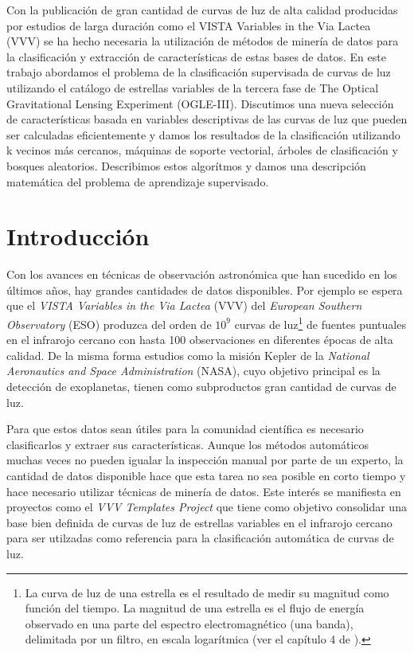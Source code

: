 \documentclass[letterpaper,12pt]{book}
\begin{document}
Con la publicación de gran cantidad de curvas de luz de alta calidad producidas por  estudios de larga duración como el  VISTA Variables in the Via Lactea (VVV) se ha hecho necesaria la utilización de métodos de minería de datos para la clasificación y extracción de características de estas bases de datos. En este trabajo abordamos el problema de la clasificación supervisada de curvas de luz utilizando el catálogo de  estrellas variables de la tercera fase de The Optical Gravitational Lensing Experiment (OGLE-III). Discutimos una nueva selección de características basada en variables descriptivas de las curvas de luz que pueden ser calculadas eficientemente y damos los resultados de la clasificación utilizando k vecinos más cercanos, máquinas de soporte vectorial, árboles de clasificación y bosques aleatorios. Describimos estos algorítmos y damos una descripción matemática del problema de aprendizaje supervisado.



\tableofcontents

 
\chapter{Introducción}

Con los avances en técnicas de observación astronómica que han sucedido en los últimos años, hay grandes cantidades de datos disponibles. Por ejemplo se espera que el \textit{VISTA Variables in the Via Lactea} (VVV) del \textit{European Southern Observatory} (ESO) produzca del orden de $10^{9}$ curvas de luz\footnote{\label{nota:curvasDeLuz} La curva de luz de una estrella es el resultado de medir su magnitud como función del tiempo. La magnitud de una estrella es el flujo de energía observado en una parte del espectro electromagnético (una banda), delimitada por un filtro, en escala logarítmica (ver el capítulo 4 de \cite{karttunen_fundamental_2007}).} de fuentes puntuales en el infrarojo cercano con hasta 100 observaciones en diferentes épocas de alta calidad. De la misma forma estudios como la misión Kepler de la \textit{National Aeronautics and Space Administration} (NASA), cuyo objetivo principal es la detección de exoplanetas,  tienen como subproductos gran cantidad de curvas  de luz. 

Para que estos datos sean útiles para la comunidad científica es necesario clasificarlos y extraer sus características. Aunque los métodos automáticos muchas veces no pueden igualar la inspección manual por parte de un experto, la cantidad de datos disponible hace que esta tarea no sea posible en corto tiempo y hace necesario utilizar técnicas de minería de datos. Este interés se manifiesta en proyectos como el \textit{VVV Templates Project} que tiene como objetivo consolidar una base bien definida de curvas de luz de estrellas variables en el infrarojo cercano para ser utilzadas como referencia para la clasificación automática de curvas de luz.
\end{document}
